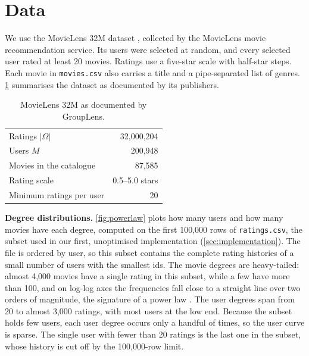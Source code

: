\documentclass{article}
\theoremstyle{plain}
\theoremstyle{definition}
\theoremstyle{remark}
\begin{document}
\section{Data}
\label{sec:data}

We use the MovieLens 32M dataset \cite{harper2015movielens}, collected by
the MovieLens movie recommendation service. Its users were selected at
random, and every selected user rated at least 20 movies. Ratings use a
five-star scale with half-star steps. Each movie in \texttt{movies.csv}
also carries a title and a pipe-separated list of genres.
\cref{tab:data} summarises the dataset as documented by its publishers.

\begin{table}[t]
\caption{MovieLens 32M as documented by GroupLens.}
\label{tab:data}
\vskip 0.15in
\begin{center}
\begin{small}
\begin{tabular}{lr}
\toprule
Ratings $|\Omega|$                 & 32{,}000{,}204 \\
Users $M$                          & 200{,}948 \\
Movies in the catalogue            & 87{,}585 \\
Rating scale                       & 0.5--5.0 stars \\
Minimum ratings per user           & 20 \\
\bottomrule
\end{tabular}
\end{small}
\end{center}
\vskip -0.1in
\end{table}

\textbf{Degree distributions.}
\cref{fig:powerlaw} plots how many users and how many movies have each
degree, computed on the first 100{,}000 rows of \texttt{ratings.csv}, the
subset used in our first, unoptimised implementation
(\cref{sec:implementation}). The file is ordered by user, so this subset
contains the complete rating histories of a small number of users with the
smallest ids. The movie degrees are heavy-tailed: almost 4{,}000 movies
have a single rating in this subset, while a few have more than 100, and
on log-log axes the frequencies fall close to a straight line over two
orders of magnitude, the signature of a power law
\cite{clauset2009power}. The user degrees span from 20 to almost 3{,}000
ratings, with most users at the low end. Because the subset holds few
users, each user degree occurs only a handful of times, so the user curve
is sparse. The single user with fewer than 20 ratings is the last one in
the subset, whose history is cut off by the 100{,}000-row limit.
\end{document}
